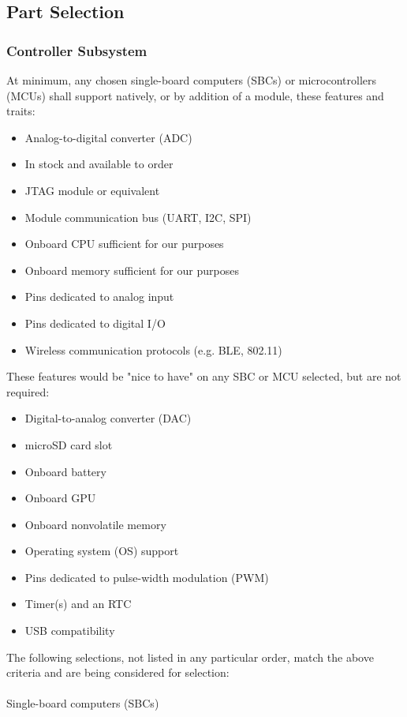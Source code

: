 \subsection{Part Selection}
\subsubsection{Controller Subsystem}                %
At minimum, any chosen single-board computers (SBCs) or microcontrollers (MCUs) shall support
natively, or by addition of a module, these features and traits:
\begin{itemize}
    \item Analog-to-digital converter (ADC)
    \item In stock and available to order
    \item JTAG module or equivalent
    \item Module communication bus (UART, I2C, SPI)
    \item Onboard CPU sufficient for our purposes
    \item Onboard memory sufficient for our purposes
    \item Pins dedicated to analog input
    \item Pins dedicated to digital I/O
    \item Wireless communication protocols (e.g. BLE, 802.11)
\end{itemize}
These features would be "nice to have" on any SBC or MCU selected, but are not required:
\begin{itemize}
    \item Digital-to-analog converter (DAC)
    \item microSD card slot
    \item Onboard battery
    \item Onboard GPU
    \item Onboard nonvolatile memory
    \item Operating system (OS) support
    \item Pins dedicated to pulse-width modulation (PWM)
    \item Timer(s) and an RTC
    \item USB compatibility
\end{itemize}
The following selections, not listed in any particular order, match the above criteria and are
being considered for selection:
\\\\
Single-board computers (SBCs)
